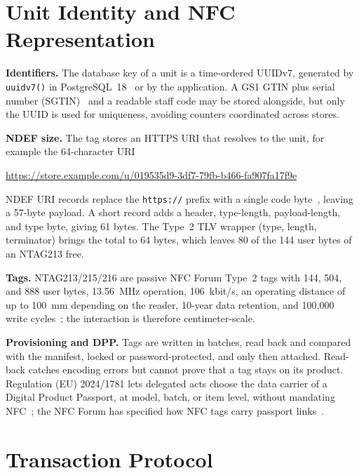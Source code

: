 \documentclass[conference]{IEEEtran}
\begin{document}
\section{Unit Identity and NFC Representation}
\label{sec:identity}

\textbf{Identifiers.}
The database key of a unit is a time-ordered UUIDv7, generated by
\texttt{uuidv7()} in PostgreSQL~18~\cite{refPGIsolation} or by the
application. A GS1 GTIN plus serial number (SGTIN)~\cite{refGS1TDS}
and a readable staff code may be stored alongside, but only the UUID
is used for uniqueness, avoiding counters coordinated across stores.

\textbf{NDEF size.}
The tag stores an HTTPS URI that resolves to the unit, for example the 64-character URI
\begin{center}\footnotesize
\url{https://store.example.com/u/019535d9-3df7-79fb-b466-fa907fa17f9e}
\end{center} NDEF URI records replace the \texttt{https://} prefix
with a single code byte~\cite{refNFCNDEF}, leaving a
57-byte payload. A short record adds a header, type-length,
payload-length, and type byte, giving 61 bytes. The Type~2 TLV wrapper
(type, length, terminator) brings the total to 64 bytes, which leaves
80 of the 144 user bytes of an NTAG213 free.

\textbf{Tags.}
NTAG213/215/216 are passive NFC Forum Type~2 tags with 144, 504, and
888 user bytes, 13.56~MHz operation, 106~kbit/s, an operating distance
of up to 100~mm depending on the reader, 10-year data retention, and
100{,}000 write cycles~\cite{refNTAG21x}; the interaction is therefore
centimeter-scale.

\textbf{Provisioning and DPP.}
Tags are written in batches, read back and compared with the
manifest, locked or password-protected, and only then attached.
Read-back catches encoding errors but cannot prove that a tag stays
on its product. Regulation (EU) 2024/1781 lets delegated acts choose
the data carrier of a Digital Product Passport, at model, batch, or
item level, without mandating NFC~\cite{refESPR}; the NFC Forum has
specified how NFC tags carry passport links~\cite{refNFCDPP}.

\section{Transaction Protocol}
\label{sec:protocol}
\end{document}
